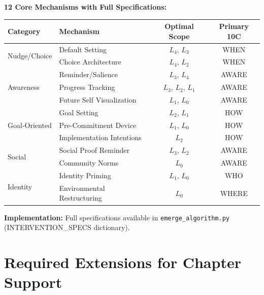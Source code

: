 \begin{tcolorbox}[colback=yellow!5!white, colframe=yellow!75!black,
    title=\textbf{EIT-EMP-3-D4-CAT: Mechanism Categories with Scope Alignment}]

\textbf{12 Core Mechanisms with Full Specifications:}

\vspace{0.5em}
\begin{center}
\scriptsize
\begin{tabular}{llcc}
\toprule
\textbf{Category} & \textbf{Mechanism} & \textbf{Optimal Scope} & \textbf{Primary 10C} \\
\midrule
\multirow{2}{*}{Nudge/Choice} & Default Setting & $L_4$, $L_3$ & WHEN \\
 & Choice Architecture & $L_4$, $L_2$ & WHEN \\
\midrule
\multirow{3}{*}{Awareness} & Reminder/Salience & $L_3$, $L_4$ & AWARE \\
 & Progress Tracking & $L_3$, $L_2$, $L_1$ & AWARE \\
 & Future Self Visualization & $L_1$, $L_0$ & AWARE \\
\midrule
\multirow{3}{*}{Goal-Oriented} & Goal Setting & $L_2$, $L_1$ & HOW \\
 & Pre-Commitment Device & $L_1$, $L_0$ & HOW \\
 & Implementation Intentions & $L_2$ & HOW \\
\midrule
\multirow{2}{*}{Social} & Social Proof Reminder & $L_3$, $L_2$ & AWARE \\
 & Community Norms & $L_0$ & AWARE \\
\midrule
\multirow{2}{*}{Identity} & Identity Priming & $L_1$, $L_0$ & WHO \\
 & Environmental Restructuring & $L_0$ & WHERE \\
\bottomrule
\end{tabular}
\end{center}

\textbf{Implementation:} Full specifications available in \texttt{emerge\_algorithm.py} (INTERVENTION\_SPECS dictionary).

\end{tcolorbox}

\section{Required Extensions for Chapter Support}
\label{sec:ie-todos}

